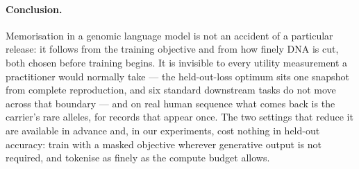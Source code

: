 \paragraph{Conclusion.}
Memorisation in a genomic language model is not an accident of a particular release: it follows from
the training objective and from how finely DNA is cut, both chosen before training begins. It is
invisible to every utility measurement a practitioner would normally take --- the held-out-loss
optimum sits one snapshot from complete reproduction, and six standard downstream tasks do not move
across that boundary --- and on real human sequence what comes back is the carrier's rare alleles,
for records that appear once. The two settings that reduce it are available in advance and, in our
experiments, cost nothing in held-out accuracy: train with a masked objective wherever generative
output is not required, and tokenise as finely as the compute budget allows.
